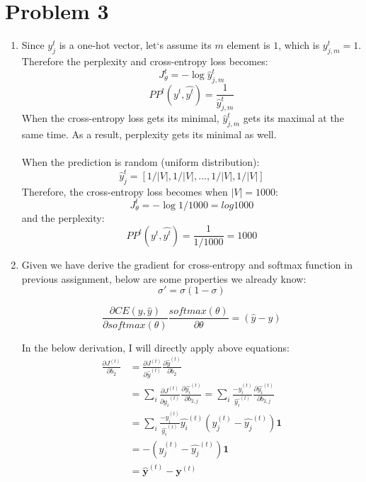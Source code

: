 \documentclass[10pt]{article}
\begin{document}
\section*{Problem 3}
\begin{enumerate}[label=(\alph*)]
\item
Since $y_j^{t}$ is a one-hot vector, let`s assume its $m$ element is $1$, which is $y_{j,m}^{t} = 1$.
Therefore the perplexity and cross-entropy loss becomes:
\begin{equation*}
	J_{\theta}^{t} = - \log{\hat{y}_{j,m}^{t}}
\end{equation*}
\begin{equation*}
	PP^{t}(y^t, \hat{y^t}) = \frac{1}{\hat{y}_{j,m}^{t}}
\end{equation*}
When the cross-entropy loss gets its minimal, $\hat{y}_{j,m}^{t}$ gets its maximal at the same time.
As a result, perplexity gets its minimal as well.\\
\\
When the prediction is random (uniform distribution):
\begin{equation}
	\hat{y}_{j}^{t} = [1/|V|, 1/|V|, ..., 1/|V|, 1/|V|]
\end{equation}
Therefore, the cross-entropy loss becomes when $|V|=1000$:
\begin{equation}
	J_{\theta}^{t} = -\log{1/1000} = log{1000}
\end{equation}
and the perplexity:
\begin{equation}
	PP^{t}(y^t, \hat{y^t}) = \frac{1}{1/1000} = 1000
\end{equation}

\item
Given we have derive the gradient for cross-entropy and softmax function in previous assignment, below are some properties we already know:
\begin{equation}
	\sigma' = \sigma(1-\sigma)
\end{equation}

\begin{equation}
	\frac{\partial CE(y, \hat{y})}{\partial softmax(\theta)}\frac{softmax(\theta)}{\partial \theta} = (\hat{y} - y)
\end{equation}

In the below derivation, I will directly apply above equations:
\begin{equation}
\begin{aligned}
	\frac{\partial J^{(t)}}{\partial b_2} & = \frac{\partial J^{(t)}}{\partial \hat{y}^{(t)}}
	\frac{\partial \hat{y}^{(t)}}{\partial b_2}\\
	& = \sum_i\frac{\partial J^{(t)}}{\partial \hat{y_i}^{(t)}}
	\frac{\partial \hat{y_i}^{(t)}}{\partial b_{2,j}}
	= \sum_i\frac{-y_i^{(t)}}{\hat{y_i}^{(t)}}
	\frac{\partial \hat{y_i}^{(t)}}{\partial b_{2,j}}\\
	& = \sum_i\frac{-y_i^{(t)}}{\hat{y_i}^{(t)}}\hat{y_i}^{(t)}(y_j^{(t)}-\hat{y_j}^{(t)})\mathbf{1}\\
	& = -(y_j^{(t)}-\hat{y_j}^{(t)})\mathbf{1}\\
	& = \hat{\mathbf{y}}^{(t)} - \mathbf{y}^{(t)}
\end{aligned}
\end{equation}


\end{enumerate}
\end{document}
